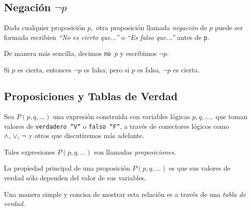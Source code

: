 \subsection{Negación $\neg p$}


 Dada cualquier proposición $p,$ otra proposición llamada \emph{negación} de $p$ puede ser formada escribien \emph{``No es cierto que...''} o \emph{``Es falso que...''} antes de \texttt{p}.
 
 De manera más sencilla, decimos \texttt{no $p$} y escribimos $\neg p.$
 
\begin{defn}[Negación]
 Si $p$ es cierta, entonces $\neg p$ es falsa; pero si $p$ es falsa, $\neg p$ es cierta.
\end{defn}
\subsection{Proposiciones y Tablas de Verdad}

 Sea $P(p,q,...)$ una expresión construida con variables lógicas $p,q,...,$ que toman valores de \texttt{verdadero ``V''} o \texttt{falso ``F''}, a trav\'es de conectores lógicos como $\wedge, \, \vee, \, \neg$ y otros  que discutiremos más adelante.
 
 Tales expresiones $P(p,q,...)$ son llamadas \emph{proposiciones.}

 La propiedad principal de una proposición $P(p,q,...)$ es que sus valores de verdad sólo dependen del valor de sus variables. 
 
 Una manera simple y concisa de mostrar esta relación es a trav\'es de una \emph{tabla de verdad.}

